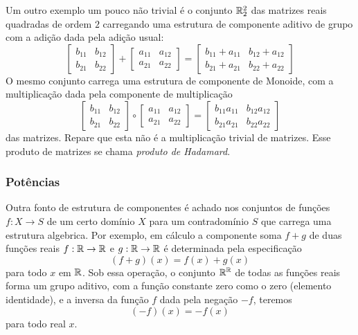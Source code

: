 Um outro exemplo um pouco não trivial é o conjunto $\mathbb{R}_{2}^{2}$ das matrizes reais quadradas de ordem $2$ carregando uma estrutura de componente aditivo de grupo com a adição dada pela adição usual:
$$\begin{bmatrix}
  b_{11} & b_{12}\\
  b_{21} & b_{22}
\end{bmatrix} +
\begin{bmatrix}
  a_{11} & a_{12}\\
  a_{21} & a_{22}
\end{bmatrix} =
\begin{bmatrix}
  b_{11} + a_{11} & b_{12} + a_{12}\\
  b_{21} + a_{21} & b_{22} + a_{22}
\end{bmatrix}
$$
O mesmo conjunto carrega uma estrutura de componente de Monoide, com a multiplicação dada pela componente de multiplicação
$$\begin{bmatrix}
  b_{11} & b_{12}\\
  b_{21} & b_{22}
\end{bmatrix} \circ
\begin{bmatrix}
  a_{11} & a_{12}\\
  a_{21} & a_{22}
\end{bmatrix} =
\begin{bmatrix}
  b_{11}a_{11} & b_{12}a_{12}\\
  b_{21}a_{21} & b_{22}a_{22}
\end{bmatrix}
$$
das matrizes. Repare que esta não é a multiplicação trivial de matrizes. Esse produto de matrizes se chama \emph{produto de Hadamard}.

\subsubsection{Potências}
Outra fonto de estrutura de componentes é achado nos conjuntos de funções $f: X\to S$ de um certo domínio $X$ para um contradomínio $S$ que carrega uma estrutura algebrica. Por exemplo, em cálculo a componente soma $f + g$ de duas funções reais $f: \mathbb{R} \to \mathbb{R}$ e $g: \mathbb{R} \to \mathbb{R}$ é determinada pela especificação
$$(f+g)(x)=f(x)+g(x)$$ para todo $x$ em $\mathbb{R}$. Sob essa operação, o conjunto $\mathbb{R}^{\mathbb{R}}$ de todas as funções reais forma um grupo aditivo, com a função constante zero como o zero (elemento identidade), e a inversa da função $f$ dada pela negação $-f$, teremos
$$(-f)(x) = -f(x)$$ para todo real $x$.

